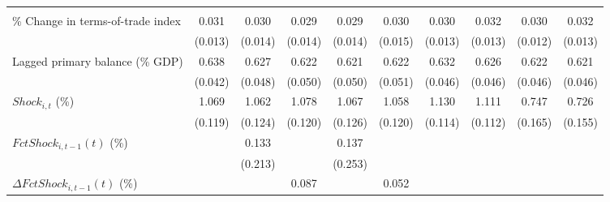 {\begin{tabular}{l*{9}{c}}
                    &                     &                     &                     &                     &                     &                     &                     &                     &                     \\
\addlinespace
\% Change in terms-of-trade index&       0.031\sym{**} &       0.030\sym{**} &       0.029\sym{**} &       0.029\sym{**} &       0.030\sym{**} &       0.030\sym{**} &       0.032\sym{**} &       0.030\sym{**} &       0.032\sym{**} \\
                    &     (0.013)         &     (0.014)         &     (0.014)         &     (0.014)         &     (0.015)         &     (0.013)         &     (0.013)         &     (0.012)         &     (0.013)         \\
\addlinespace
Lagged primary balance (\% GDP)&       0.638\sym{***}&       0.627\sym{***}&       0.622\sym{***}&       0.621\sym{***}&       0.622\sym{***}&       0.632\sym{***}&       0.626\sym{***}&       0.622\sym{***}&       0.621\sym{***}\\
                    &     (0.042)         &     (0.048)         &     (0.050)         &     (0.050)         &     (0.051)         &     (0.046)         &     (0.046)         &     (0.046)         &     (0.046)         \\
\addlinespace
$ Shock_{i,t}$ (\%) &       1.069\sym{***}&       1.062\sym{***}&       1.078\sym{***}&       1.067\sym{***}&       1.058\sym{***}&       1.130\sym{***}&       1.111\sym{***}&       0.747\sym{***}&       0.726\sym{***}\\
                    &     (0.119)         &     (0.124)         &     (0.120)         &     (0.126)         &     (0.120)         &     (0.114)         &     (0.112)         &     (0.165)         &     (0.155)         \\
\addlinespace
$ FctShock_{i,t-1}(t)$ (\%)&                     &       0.133         &                     &       0.137         &                     &                     &                     &                     &                     \\
                    &                     &     (0.213)         &                     &     (0.253)         &                     &                     &                     &                     &                     \\
\addlinespace
$ \Delta FctShock_{i,t-1}(t)$ (\%)&                     &                     &       0.087         &                     &       0.052         &                     &                     &                     &                     \\

\end{tabular}}
